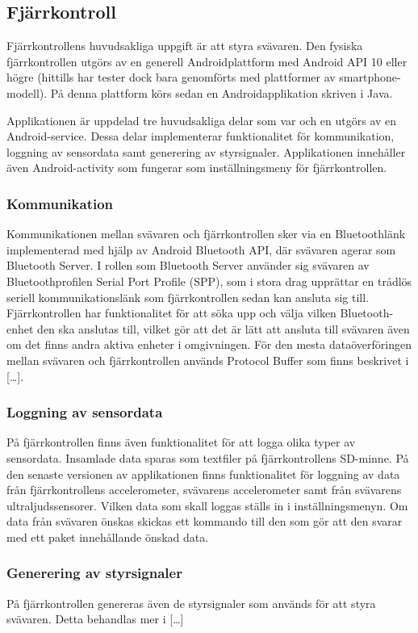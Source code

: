 \subsection{Fjärrkontroll}
Fjärrkontrollens huvudsakliga uppgift är att styra svävaren. Den fysiska fjärrkontrollen utgörs av en generell Androidplattform med Android API 10 eller högre (hittills har tester dock bara genomförts med plattformer av smartphone-modell). På denna plattform körs sedan en Androidapplikation skriven i Java. 

Applikationen är uppdelad tre huvudsakliga delar som var och en utgörs av en Android-service. Dessa delar implementerar funktionalitet för kommunikation, loggning av sensordata samt generering av styrsignaler. Applikationen innehåller även Android-activity som fungerar som inställningsmeny för fjärrkontrollen.

\subsubsection{Kommunikation}
Kommunikationen mellan svävaren och fjärrkontrollen sker via en Bluetoothlänk
implementerad med hjälp av Android Bluetooth API, där svävaren agerar som
Bluetooth Server. I rollen som Bluetooth Server använder sig svävaren av
Bluetoothprofilen Serial Port Profile (SPP), som i stora drag upprättar en
trådlös seriell kommunikationslänk som fjärrkontrollen sedan kan ansluta sig
till.
Fjärrkontrollen har funktionalitet för att söka upp och välja vilken Bluetooth-enhet den ska anslutas till, vilket gör att det är lätt att ansluta till svävaren även om det finns andra aktiva enheter i omgivningen.
För den mesta dataöverföringen mellan svävaren och fjärrkontrollen används Protocol Buffer som finns beskrivet i […].

\subsubsection{Loggning av sensordata}
På fjärrkontrollen finns även funktionalitet för att logga olika typer av sensordata. Insamlade data sparas som textfiler på fjärrkontrollens SD-minne. 
På den senaste versionen av applikationen finns funktionalitet för loggning av data från fjärrkontrollens accelerometer, svävarens accelerometer samt från svävarens ultraljudssensorer. Vilken data som skall loggas ställs in i inställningsmenyn. Om data från svävaren önskas skickas ett kommando till den som gör att den svarar med ett paket innehållande önskad data. 

\subsubsection{Generering av styrsignaler}
På fjärrkontrollen genereras även de styrsignaler som används för att styra svävaren. Detta behandlas mer i […]

